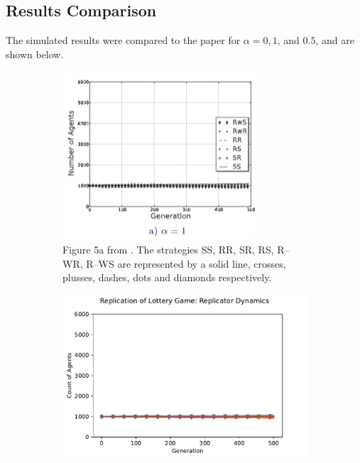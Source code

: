 \subsection{Results Comparison}
The simulated results were compared to the paper for $\alpha = 0, 1$, and $ 0.5$, and are shown below. \\

\FloatBarrier 
\begin{figure}[!h]
  \begin{subfigure}[b]{0.45\textwidth}
    \includegraphics[width=\textwidth]{images/lottery1.png}
    \caption{Figure 5a from \cite{RN30}. The strategies SS, RR, SR, RS, R--WR, R--WS are represented by a solid line, crosses, plusses, dashes, dots and diamonds respectively. }
    \label{lottery1}
  \end{subfigure}
  \hfill
  \begin{subfigure}[b]{0.45\textwidth}
    \includegraphics[width=1.25\textwidth]{images/lottery1_me.pdf}

\end{subfigure}
\end{figure}
